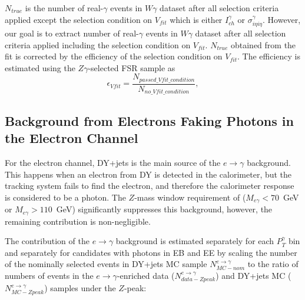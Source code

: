 $N_{true}$ is the number of real-$\gamma$ events in $W\gamma$ dataset after all selection criteria applied except the selection condition on $V_{fit}$ which is either $I_{ch}^{\gamma}$ or $\sigma_{i\eta i\eta}^{\gamma}$. However, our goal is to extract number of real-$\gamma$ events in $W\gamma$ dataset after all selection criteria applied including the selection condition on $V_{fit}$. $N_{true}$ obtained from the fit is corrected by the efficiency of the selection condition on $V_{fit}$. The efficiency is estimated using the $Z\gamma$-selected FSR sample as 
\begin{equation}
 \epsilon_{Vfit} = \frac{N_{passed\_Vfit\_condition}}{N_{no\_Vfit\_condition}},
\end{equation}


\subsection{Background from Electrons Faking Photons in the Electron Channel}
\label{sec:BackgroundSubtraction_etog}

For the electron channel, DY+jets is the main source of the $e \rightarrow \gamma$ background. This happens when an electron from DY is detected in the calorimeter, but the tracking system fails to find the electron, and therefore the calorimeter response is considered to be a photon. The $Z$-mass window requirement of ($M_{e\gamma}<70$~GeV or $M_{e\gamma}>110$~GeV) significantly suppresses this background, however, the remaining contribution is non-negligible. 

The contribution of the $e\rightarrow\gamma$ background is estimated separately for each $P_{T}^{\gamma}$ bin and separately for candidates with photons in EB and EE by scaling the number of the nominally selected events in DY+jets MC sample $N_{MC-nom}^{e\rightarrow\gamma}$ to the ratio of numbers of events in the  $e\rightarrow\gamma$-enriched data ($N_{data-Zpeak}^{e\rightarrow\gamma}$) and DY+jets MC ($N_{MC-Zpeak}^{e\rightarrow\gamma}$) samples under the $Z$-peak: 

